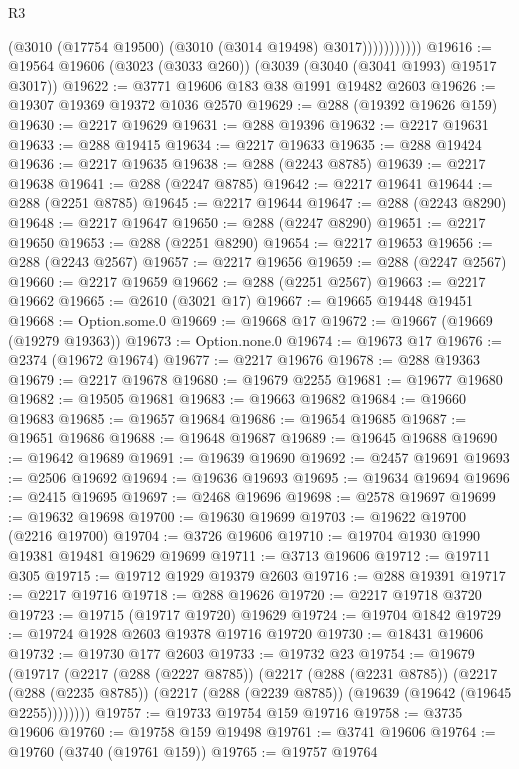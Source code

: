 \begin{lexlean}{R3}
\begin{coremodule}
                      (@3010 (@17754 @19500) (@3010 (@3014 @19498) @3017)))))))))))
@19616 := @19564 @19606 (@3023 (@3033 @260)) (@3039 (@3040 (@3041 @1993) @19517 @3017))
@19622 := @3771 @19606 @183 @38 @1991 @19482 @2603
@19626 := @19307 @19369 @19372 @1036 @2570
@19629 := @288 (@19392 @19626 @159)
@19630 := @2217 @19629
@19631 := @288 @19396
@19632 := @2217 @19631
@19633 := @288 @19415
@19634 := @2217 @19633
@19635 := @288 @19424
@19636 := @2217 @19635
@19638 := @288 (@2243 @8785)
@19639 := @2217 @19638
@19641 := @288 (@2247 @8785)
@19642 := @2217 @19641
@19644 := @288 (@2251 @8785)
@19645 := @2217 @19644
@19647 := @288 (@2243 @8290)
@19648 := @2217 @19647
@19650 := @288 (@2247 @8290)
@19651 := @2217 @19650
@19653 := @288 (@2251 @8290)
@19654 := @2217 @19653
@19656 := @288 (@2243 @2567)
@19657 := @2217 @19656
@19659 := @288 (@2247 @2567)
@19660 := @2217 @19659
@19662 := @288 (@2251 @2567)
@19663 := @2217 @19662
@19665 := @2610 (@3021 @17)
@19667 := @19665 @19448 @19451
@19668 := Option.some.{0}
@19669 := @19668 @17
@19672 := @19667 (@19669 (@19279 @19363))
@19673 := Option.none.{0}
@19674 := @19673 @17
@19676 := @2374 (@19672 @19674)
@19677 := @2217 @19676
@19678 := @288 @19363
@19679 := @2217 @19678
@19680 := @19679 @2255
@19681 := @19677 @19680
@19682 := @19505 @19681
@19683 := @19663 @19682
@19684 := @19660 @19683
@19685 := @19657 @19684
@19686 := @19654 @19685
@19687 := @19651 @19686
@19688 := @19648 @19687
@19689 := @19645 @19688
@19690 := @19642 @19689
@19691 := @19639 @19690
@19692 := @2457 @19691
@19693 := @2506 @19692
@19694 := @19636 @19693
@19695 := @19634 @19694
@19696 := @2415 @19695
@19697 := @2468 @19696
@19698 := @2578 @19697
@19699 := @19632 @19698
@19700 := @19630 @19699
@19703 := @19622 @19700 (@2216 @19700)
@19704 := @3726 @19606
@19710 := @19704 @1930 @1990 @19381 @19481 @19629 @19699
@19711 := @3713 @19606
@19712 := @19711 @305
@19715 := @19712 @1929 @19379 @2603
@19716 := @288 @19391
@19717 := @2217 @19716
@19718 := @288 @19626
@19720 := @2217 @19718 @3720
@19723 := @19715 (@19717 @19720) @19629
@19724 := @19704 @1842
@19729 := @19724 @1928 @2603 @19378 @19716 @19720
@19730 := @18431 @19606
@19732 := @19730 @177 @2603
@19733 := @19732 @23
@19754 := @19679
    (@19717
      (@2217
        (@288 (@2227 @8785))
        (@2217
          (@288 (@2231 @8785))
          (@2217
            (@288 (@2235 @8785))
            (@2217 (@288 (@2239 @8785)) (@19639 (@19642 (@19645 @2255))))))))
@19757 := @19733 @19754 @159 @19716
@19758 := @3735 @19606
@19760 := @19758 @159 @19498
@19761 := @3741 @19606
@19764 := @19760 (@3740 (@19761 @159))
@19765 := @19757 @19764

\end{coremodule}
\end{lexlean}
